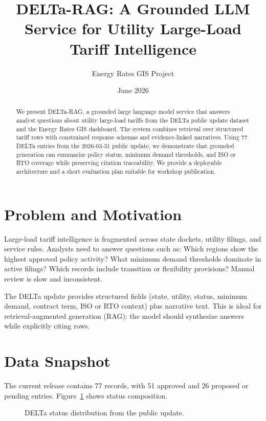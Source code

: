 \documentclass[11pt]{article}
\title{DELTa-RAG: A Grounded LLM Service for Utility Large-Load Tariff Intelligence}
\author{Energy Rates GIS Project}
\date{June 2026}
\begin{document}
\maketitle

\begin{abstract}
We present DELTa-RAG, a grounded large language model service that answers analyst questions about utility large-load tariffs from the DELTa public update dataset and the Energy Rates GIS dashboard. The system combines retrieval over structured tariff rows with constrained response schemas and evidence-linked narratives. Using 77 DELTa entries from the 2026-03-31 public update, we demonstrate that grounded generation can summarize policy status, minimum demand thresholds, and ISO or RTO coverage while preserving citation traceability. We provide a deployable architecture and a short evaluation plan suitable for workshop publication.
\end{abstract}

\section{Problem and Motivation}
Large-load tariff intelligence is fragmented across state dockets, utility filings, and service rules. Analysts need to answer questions such as: Which regions show the highest approved policy activity? What minimum demand thresholds dominate in active filings? Which records include transition or flexibility provisions? Manual review is slow and inconsistent.

The DELTa update provides structured fields (state, utility, status, minimum demand, contract term, ISO or RTO context) plus narrative text. This is ideal for retrieval-augmented generation (RAG): the model should synthesize answers while explicitly citing rows.

\section{Data Snapshot}
The current release contains 77 records, with 51 approved and 26 proposed or pending entries. Figure~\ref{fig:status} shows status composition.

\begin{figure}[ht]
\centering
{}
\caption{DELTa status distribution from the public update.}
\label{fig:status}
\end{figure}
\end{document}
